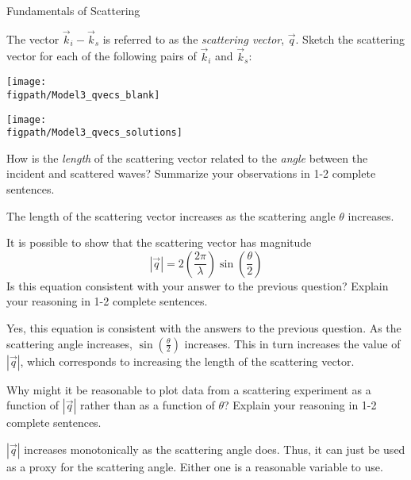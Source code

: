 \begin{activity}{Fundamentals of Scattering}
\begin{model}
	
\end{model}

\begin{ctqs}
	
	\question The vector $\vec k_i - \vec k_s$ is referred to as the \emph{scattering vector}, $\vec q$.  Sketch the scattering vector for each of the following pairs of $\vec k_i$ and $\vec k_s$:
		
		\begin{solution}[1.5in]{\centerline{\texttt{[image: \\figpath/Model3\_qvecs\_blank]}}}
			\centerline{\texttt{[image: \\figpath/Model3\_qvecs\_solutions]}}
		\end{solution}
		
	\question How is the \emph{length} of the scattering vector related to the \emph{angle} between the incident and scattered waves?  Summarize your observations in 1-2 complete sentences.
		
		\begin{solution}[1.25in]{}
			The length of the scattering vector increases as the scattering angle $\theta$ increases.
		\end{solution}
		
	\question It is possible to show that the scattering vector has magnitude \label{\labelbase:ctq:magq}
	\begin{equation*}
		|\vec q| = 2\left(\frac{2\pi}{\lambda}\right)\sin\left(\frac{\theta}{2}\right)
	\end{equation*}
		Is this equation consistent with your answer to the previous question?  Explain your reasoning in 1-2 complete sentences.
		
		\begin{solution}[1in]{}
			Yes, this equation is consistent with the answers to the previous question.  As the scattering angle increases, $\sin\left(\frac{\theta}{2}\right)$ increases.  This in turn increases the value of $|\vec q|$, which corresponds to increasing the length of the scattering vector.
		\end{solution}

	\question Why might it be reasonable to plot data from a scattering experiment as a function of $|\vec q|$ rather than as a function of $\theta$?  Explain your reasoning in 1-2 complete sentences.
	
		\begin{solution}[1in]{}
			$|\vec q|$ increases monotonically as the scattering angle does.  Thus, it can just be used as a proxy for the scattering angle.  Either one is a reasonable variable to use.
		\end{solution}
		


\end{ctqs}
\end{activity}
